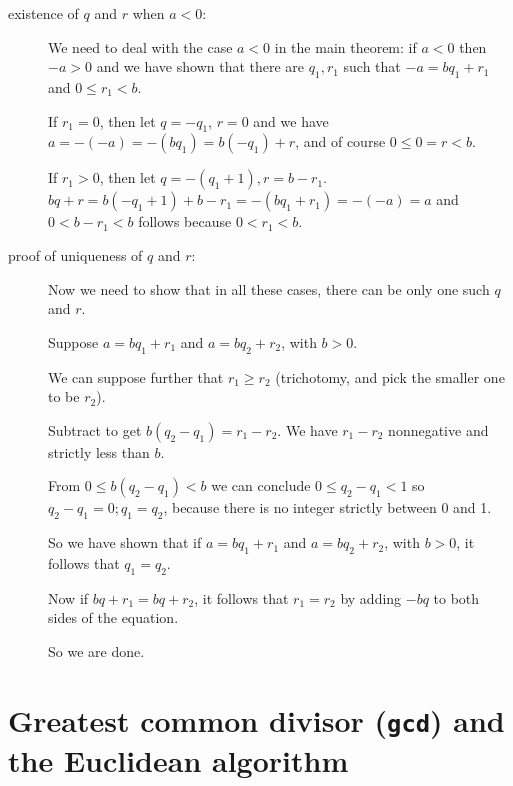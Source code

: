 \documentclass[12pt]{article}
\begin{document}
\begin{description}
\begin{description}
\item[existence of $q$ and $r$ when $a<0$:]

We need to deal with the case $a<0$ in the main theorem:  if $a<0$ then $-a>0$ and we have shown
that there are $q_1,r_1$ such that $-a = bq_1 + r_1$ and $0 \leq r_1 <b$.

If $r_1 =0$, then let $q=-q_1$, $r=0$ and we have $a = -(-a) = -(bq_1) = b(-q_1)+r$, and of course $0 \leq 0=r <b$.

If $r_1>0$, then let $q=-(q_1+1), r = b-r_1$.  $bq+r = b(-q_1+1) +b -r_1 = -(bq_1+r_1) = -(-a)=a$
and $0<b-r_1<b$ follows because $0<r_1<b$.

\item[proof of uniqueness of $q$ and $r$:]

Now we need to show that in all these cases, there can be only one such $q$ and $r$.

Suppose $a=bq_1+r_1$ and $a=bq_2+r_2$, with $b>0$.

We can suppose further that $r_1 \geq r_2$ (trichotomy, and pick the smaller one to be $r_2$).

Subtract to get $b(q_2-q_1)= r_1-r_2$.  We have $r_1-r_2$ nonnegative and strictly less than $b$.

From $0 \leq b(q_2-q_1) < b$ we can conclude $0 \leq q_2-q_1<1$ so $q_2-q_1=0; q_1=q_2$, because there is no integer strictly between 0 and 1.

So we have shown that if $a=bq_1+r_1$ and $a=bq_2+r_2$, with $b>0$, it follows that $q_1=q_2$.

Now if $bq+r_1=bq+r_2$, it follows that $r_1=r_2$ by adding $-bq$ to both sides of the equation.

So we are done.

\end{description}


\end{description}


\section{Greatest common divisor ({\tt gcd}) and the Euclidean algorithm}
\end{document}
